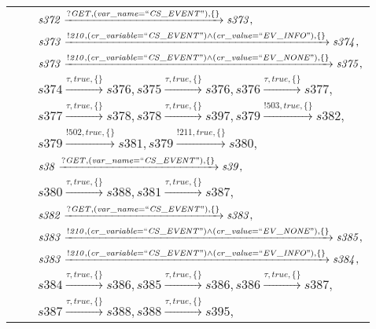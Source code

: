 \begin{tabular}{lcp{350px}}
& & $\mathit{s372}\xrightarrow{\mathit{?GET}, \mathit{(var\_name = ``CS\_EVENT")}, \{\}}\mathit{s373},$ \\
& & $\mathit{s373}\xrightarrow{\mathit{!210}, \mathit{(cr\_variable = ``CS\_EVENT") \land (cr\_value = ``EV\_INFO")}, \{\}}\mathit{s374},$ \\
& & $\mathit{s373}\xrightarrow{\mathit{!210}, \mathit{(cr\_variable = ``CS\_EVENT") \land (cr\_value = ``EV\_NONE")}, \{\}}\mathit{s375},$ \\
& & $\mathit{s374}\xrightarrow{\mathit{\tau}, \mathit{true}, \{\}}\mathit{s376},\mathit{s375}\xrightarrow{\mathit{\tau}, \mathit{true}, \{\}}\mathit{s376},\mathit{s376}\xrightarrow{\mathit{\tau}, \mathit{true}, \{\}}\mathit{s377},$ \\
& & $\mathit{s377}\xrightarrow{\mathit{\tau}, \mathit{true}, \{\}}\mathit{s378},\mathit{s378}\xrightarrow{\mathit{\tau}, \mathit{true}, \{\}}\mathit{s397},\mathit{s379}\xrightarrow{\mathit{!503}, \mathit{true}, \{\}}\mathit{s382},$ \\
& & $\mathit{s379}\xrightarrow{\mathit{!502}, \mathit{true}, \{\}}\mathit{s381},\mathit{s379}\xrightarrow{\mathit{!211}, \mathit{true}, \{\}}\mathit{s380},$ \\
& & $\mathit{s38}\xrightarrow{\mathit{?GET}, \mathit{(var\_name = ``CS\_EVENT")}, \{\}}\mathit{s39},$ \\
& & $\mathit{s380}\xrightarrow{\mathit{\tau}, \mathit{true}, \{\}}\mathit{s388},\mathit{s381}\xrightarrow{\mathit{\tau}, \mathit{true}, \{\}}\mathit{s387},$ \\
& & $\mathit{s382}\xrightarrow{\mathit{?GET}, \mathit{(var\_name = ``CS\_EVENT")}, \{\}}\mathit{s383},$ \\
& & $\mathit{s383}\xrightarrow{\mathit{!210}, \mathit{(cr\_variable = ``CS\_EVENT") \land (cr\_value = ``EV\_NONE")}, \{\}}\mathit{s385},$ \\
& & $\mathit{s383}\xrightarrow{\mathit{!210}, \mathit{(cr\_variable = ``CS\_EVENT") \land (cr\_value = ``EV\_INFO")}, \{\}}\mathit{s384},$ \\
& & $\mathit{s384}\xrightarrow{\mathit{\tau}, \mathit{true}, \{\}}\mathit{s386},\mathit{s385}\xrightarrow{\mathit{\tau}, \mathit{true}, \{\}}\mathit{s386},\mathit{s386}\xrightarrow{\mathit{\tau}, \mathit{true}, \{\}}\mathit{s387},$ \\
& & $\mathit{s387}\xrightarrow{\mathit{\tau}, \mathit{true}, \{\}}\mathit{s388},\mathit{s388}\xrightarrow{\mathit{\tau}, \mathit{true}, \{\}}\mathit{s395},$ \\

\end{tabular}
